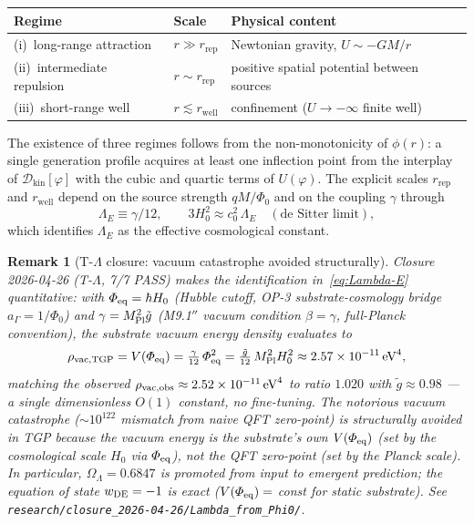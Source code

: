 \documentclass[11pt,a4paper]{article}
\renewcommand{\Phi}{\varPhi}
\newcommand{\PhiZero}{\varPhi_{0}}
\newcommand{\DD}{\mathcal{D}}
\newtheorem{remark}[axiom]{Remark}
\begin{document}
\begin{center}\small
\begin{tabular}{@{}lll@{}}
\toprule
\textbf{Regime} & \textbf{Scale} & \textbf{Physical content}\\
\midrule
(i)\ long-range attraction   & $r\gg r_{\mathrm{rep}}$ & Newtonian gravity, $U\sim -GM/r$\\
(ii)\ intermediate repulsion & $r\sim r_{\mathrm{rep}}$ & positive spatial potential between sources\\
(iii)\ short-range well      & $r\lesssim r_{\mathrm{well}}$ & confinement ($U\to-\infty$ finite well)\\
\bottomrule
\end{tabular}
\end{center}

The existence of three regimes follows from the non-monotonicity of
$\phi(r)$: a single generation profile acquires at least one inflection
point from the interplay of $\DD_{\mathrm{kin}}[\varphi]$ with the cubic
and quartic terms of $U(\varphi)$. The explicit scales $r_{\mathrm{rep}}$
and $r_{\mathrm{well}}$ depend on the source strength $qM/\PhiZero$ and on
the coupling $\gamma$ through
\begin{equation}\label{eq:Lambda-E}
  \Lambda_{E}\equiv\gamma/12,
  \qquad
  3H_{0}^{2}\approx c_{0}^{2}\,\Lambda_{E}
  \quad(\text{de Sitter limit}),
\end{equation}
which identifies $\Lambda_{E}$ as the effective cosmological constant.

\begin{remark}[T-$\Lambda$ closure: vacuum catastrophe avoided structurally]
\label{rem:T-Lambda}
Closure 2026-04-26 (T-$\Lambda$, 7/7 PASS) makes the identification
in~\eqref{eq:Lambda-E} \emph{quantitative}: with $\Phi_{\rm eq} = \hbar H_0$
(Hubble cutoff, OP-3 substrate-cosmology bridge $a_\Gamma = 1/\Phi_0$)
and $\gamma = M_{\rm Pl}^2 \tilde g$ (M9.1$''$ vacuum condition $\beta = \gamma$,
full-Planck convention), the substrate vacuum energy density evaluates to
\[
  \rho_{\rm vac,TGP} = V(\Phi_{\rm eq}) = \tfrac{\gamma}{12}\,\Phi_{\rm eq}^2
                     = \tfrac{\tilde g}{12}\,M_{\rm Pl}^2 H_0^2
                     \approx 2.57 \times 10^{-11}\,\text{eV}^4,
\]
matching the observed $\rho_{\rm vac,obs} \approx 2.52 \times 10^{-11}\,\text{eV}^4$
to ratio $1.020$ with $\tilde g \approx 0.98$ — a single dimensionless $O(1)$
constant, no fine-tuning. The notorious vacuum catastrophe ($\sim 10^{122}$
mismatch from naive QFT zero-point) is \emph{structurally} avoided in TGP
because the vacuum energy is the substrate's own $V(\Phi_{\rm eq})$ (set by
the cosmological scale $H_0$ via $\Phi_{\rm eq}$), not the QFT zero-point
(set by the Planck scale). In particular, $\Omega_\Lambda = 0.6847$ is
promoted from \emph{input} to \emph{emergent prediction}; the equation of
state $w_{\rm DE} = -1$ is exact ($V(\Phi_{\rm eq}) = $ const for static
substrate). See \texttt{research/closure\_2026-04-26/Lambda\_from\_Phi0/}.
\end{remark}
\end{document}
